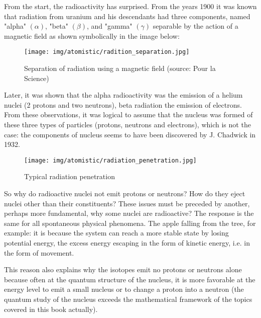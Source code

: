 	From the start, the radioactivity has surprised. From the years 1900 it was known that radiation from uranium and his descendants had three components, named "alpha" $(\alpha)$, "beta" $(\beta)$, and "gamma" $(\gamma)$ separable by the action of a magnetic field as shown symbolically in the image below:
	\begin{figure}[H]
		\begin{center}
		\texttt{[image: img/atomistic/radition\_separation.jpg]}
		\end{center}	
		\caption[Separation of radiation using a magnetic field]{Separation of radiation using a magnetic field (source: Pour la Science)}
	\end{figure}
	Later, it was shown that the alpha radioactivity was the emission of a helium nuclei (2 protons and two neutrons), beta radiation the emission of electrons. From these observations, it was logical to assume that the nucleus was formed of these three types of particles (protons, neutrons and electrons), which is not the case: the  components of nucleus seems to have been discovered by J. Chadwick in 1932.
	\begin{figure}[H]
		\begin{center}
		\texttt{[image: img/atomistic/radiation\_penetration.jpg]}
		\end{center}	
		\caption{Typical radiation penetration}
	\end{figure}
	
	So why do radioactive nuclei not emit protons or neutrons? How do they eject nuclei other than their constituents? These issues must be preceded by another, perhaps more fundamental, why some nuclei are radioactive? The response is the same for all spontaneous physical phenomena. The apple falling from the tree, for example: it is because the system can reach a more stable state by losing potential energy, the excess energy escaping in the form of kinetic energy, i.e. in the form of movement.
	
	This reason also explains why the isotopes emit no protons or neutrons alone because often at the quantum structure of the nucleus, it is more favorable at the energy level to emit a small nucleus or to change a proton into a neutron (the quantum study of the nucleus exceeds the mathematical framework of the topics covered in this book actually).
	
